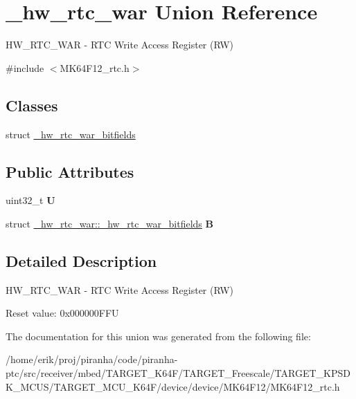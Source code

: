 \hypertarget{union__hw__rtc__war}{}\section{\+\_\+hw\+\_\+rtc\+\_\+war Union Reference}
\label{union__hw__rtc__war}


H\+W\+\_\+\+R\+T\+C\+\_\+\+W\+AR -\/ R\+TC Write Access Register (RW)  




{\ttfamily \#include $<$M\+K64\+F12\+\_\+rtc.\+h$>$}

\subsection*{Classes}
\begin{DoxyCompactItemize}
\item 
struct \hyperlink{struct__hw__rtc__war_1_1__hw__rtc__war__bitfields}{\+\_\+hw\+\_\+rtc\+\_\+war\+\_\+bitfields}
\end{DoxyCompactItemize}
\subsection*{Public Attributes}
\begin{DoxyCompactItemize}
\item 
uint32\+\_\+t {\bfseries U}\hypertarget{union__hw__rtc__war_ae2290cc782e07a91975af6bb14c3b0c0}{}\label{union__hw__rtc__war_ae2290cc782e07a91975af6bb14c3b0c0}

\item 
struct \hyperlink{struct__hw__rtc__war_1_1__hw__rtc__war__bitfields}{\+\_\+hw\+\_\+rtc\+\_\+war\+::\+\_\+hw\+\_\+rtc\+\_\+war\+\_\+bitfields} {\bfseries B}\hypertarget{union__hw__rtc__war_a091032d1824d3450ffcca80b824d1fbf}{}\label{union__hw__rtc__war_a091032d1824d3450ffcca80b824d1fbf}

\end{DoxyCompactItemize}


\subsection{Detailed Description}
H\+W\+\_\+\+R\+T\+C\+\_\+\+W\+AR -\/ R\+TC Write Access Register (RW) 

Reset value\+: 0x000000\+F\+FU 

The documentation for this union was generated from the following file\+:\begin{DoxyCompactItemize}
\item 
/home/erik/proj/piranha/code/piranha-\/ptc/src/receiver/mbed/\+T\+A\+R\+G\+E\+T\+\_\+\+K64\+F/\+T\+A\+R\+G\+E\+T\+\_\+\+Freescale/\+T\+A\+R\+G\+E\+T\+\_\+\+K\+P\+S\+D\+K\+\_\+\+M\+C\+U\+S/\+T\+A\+R\+G\+E\+T\+\_\+\+M\+C\+U\+\_\+\+K64\+F/device/device/\+M\+K64\+F12/M\+K64\+F12\+\_\+rtc.\+h\end{DoxyCompactItemize}
